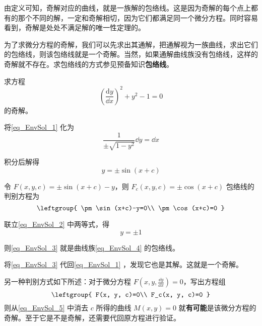 由定义可知，奇解对应的曲线，就是一族解的包络线。这是因为奇解的每个点上都有的那个不同的解，一定和奇解相切，因为它们都满足同一个微分方程。同时容易看到，奇解是处处不满足解的唯一性定理的。

为了求微分方程的奇解，我们可以先求出其通解，把通解视为一族曲线，求出它们的包络线，则该包络线就是一个奇解。当然，如果通解曲线族没有包络线，这样的奇解就不存在。求包络线的方式参见预备知识\textbf{包络线}。

\begin{example}{}
求方程
\begin{equation}\label{eq_EnvSol_1}
(\frac{\mathrm{d} y}{\dd x})^2+y^2-1=0
\end{equation}
的奇解。

将\autoref{eq_EnvSol_1} 化为
\begin{equation}
\frac{1}{\pm\sqrt{1-y^2}}\dd y=\dd x
\end{equation}

积分后解得
\begin{equation}\label{eq_EnvSol_4}
y=\pm\sin(x+c)
\end{equation}

令 $F(x, y, c)=\pm\sin(x+c)-y$，则 $F_c(x, y, c)=\pm\cos(x+c)$ 包络线的判别方程为
\begin{equation}\label{eq_EnvSol_2}
\leftgroup{
    \pm\sin(x+c)-y=0\\
    \pm\cos(x+c)=0
}
\end{equation}

联立\autoref{eq_EnvSol_2} 中两等式，得
\begin{equation}\label{eq_EnvSol_3}
y=\pm 1
\end{equation}

则\autoref{eq_EnvSol_3} 就是曲线族\autoref{eq_EnvSol_4} 的包络线。

将\autoref{eq_EnvSol_3} 代回\autoref{eq_EnvSol_1} ，发现它也是其解。这就是一个奇解。


\end{example}

另一种判别方式如下所述：对于微分方程 $F(x, y, \frac{\dd y}{\dd x})=0$，写出方程组
\begin{equation}\label{eq_EnvSol_5}
\leftgroup{
    F(x, y, c)=0\\
    F_c(x, y, c)=0
}
\end{equation}
则从\autoref{eq_EnvSol_5} 中消去 $c$ 所得的曲线 $M(x, y)=0$ 就\textbf{有可能}是该微分方程的奇解。至于它是不是奇解，还需要代回原方程进行验证。


